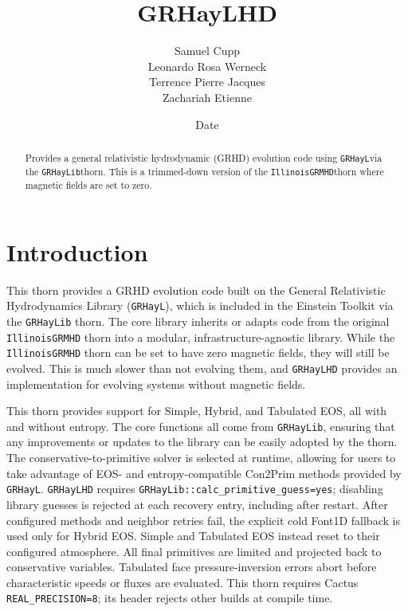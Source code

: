 \documentclass{article}
\begin{document}
\title{GRHayLHD}
\author{Samuel Cupp \\ Leonardo Rosa Werneck \\ Terrence Pierre Jacques \\ Zachariah Etienne}
\date{$ $Date$ $}

\maketitle


\newcommand{\grhayl}{\texttt{GRHayL}}
\newcommand{\glib}{\texttt{GRHayLib}}
\newcommand{\ghd}{\texttt{GRHayLHD}}
\newcommand{\igm}{\texttt{IllinoisGRMHD}}
\newcommand{\hydrobase}{\texttt{HydroBase}}

\begin{abstract}
Provides a general relativistic hydrodynamic (GRHD) evolution code
using \grhayl via the \glib thorn. This is a trimmed-down version
of the \igm thorn where magnetic fields are set to zero.
\end{abstract}

\section{Introduction}

This thorn provides a GRHD evolution code built on
the General Relativistic Hydrodynamics Library (\grhayl),
which is included in the Einstein Toolkit via the \glib{}
thorn. The core library inherits or adapts code from the
original \igm{} thorn into a modular, infrastructure-agnostic
library. While the \igm{} thorn can be set to have
zero magnetic fields, they will still be evolved. This
is much slower than not evolving them, and \ghd{} provides an
implementation for evolving systems without magnetic
fields.

This thorn provides support for Simple, Hybrid, and Tabulated EOS, all
with and without entropy. The core functions all come from \glib,
ensuring that any improvements or updates to the library can
be easily adopted by the thorn. The conservative-to-primitive
solver is selected at runtime, allowing for users to take
advantage of EOS- and entropy-compatible Con2Prim methods provided by \grhayl.
\ghd{} requires \texttt{GRHayLib::calc\_primitive\_guess=yes}; disabling
library guesses is rejected at each recovery entry, including after restart.
After configured methods and neighbor retries fail, the explicit cold Font1D
fallback is used only for Hybrid EOS. Simple and Tabulated EOS instead reset
to their configured atmosphere. All final primitives are limited and projected
back to conservative variables. Tabulated face pressure-inversion errors abort
before characteristic speeds or fluxes are evaluated.
This thorn requires Cactus \texttt{REAL\_PRECISION=8}; its header rejects
other builds at compile time.
\end{document}
